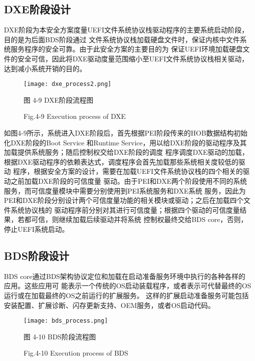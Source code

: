 \subsection{DXE阶段设计}
DXE阶段为本安全方案度量UEFI文件系统协议栈驱动程序的主要系统启动阶段，目的是为后面BDS阶段通过
文件系统协议栈加载硬盘文件时，保证内核中文件系统服务程序的安全可靠。由于此安全方案的主要目的为
保证UEFI环境加载硬盘文件的安全可信，因此将DXE驱动度量范围缩小至UEFI文件系统协议栈相关驱动，
达到减小系统开销的目的。

\begin{figure}[h]
    \vspace{0cm}   
    \setlength{\abovecaptionskip}{0.3cm}
	\centering
    \texttt{[image: dxe\_process2.png]}
    \caption*{图 4-9 DXE阶段流程图}
    \setlength{\belowcaptionskip}{-0.5cm}
    \caption*{Fig.4-9 Execution process of DXE}
\end{figure}

如图4-9所示，系统进入DXE阶段后，首先根据PEI阶段传来的HOB数据结构初始化DXE阶段的Boot Service
和Runtime Service，用以给DXE阶段的驱动程序及其加载提供系统服务；随后控制权交给DXE阶段的调度
程序调度DXE驱动的加载，根据DXE驱动程序的依赖表达式，调度程序会首先加载那些系统相关度较低的驱动
程序，根据安全方案的设计，需要在加载UEFI文件系统协议栈的四个相关的驱动之前加载DXE阶段的可信度量
驱动。由于PEI和DXE两个阶段使用不同的系统服务，而可信度量模块中需要分别使用到PEI系统服务和DXE系统
服务，因此为PEI和DXE阶段分别设计两个可信度量功能的相关模块或驱动；之后在加载四个文件系统协议栈的
驱动程序前分别对其进行可信度量；根据四个驱动的可信度量结果，若都可信，则继续加载后续驱动并将系统
控制权最终交给BDS core，否则，停止UEFI系统启动。

\subsection{BDS阶段设计}
BDS core通过BDS架构协议定位和加载在启动准备服务环境中执行的各种各样的应用。这些应用可
能表示一个传统的OS启动装载程序，或者表示可代替最终的OS运行或在加载最终的OS之前运行的扩展服务。
这样的扩展启动准备服务可能包括安装配置、扩展诊断、闪存更新支持、OEM服务，或者OS启动代码。

\begin{figure}[htb]
    \vspace{0cm}   
    \setlength{\abovecaptionskip}{0.3cm}
	\centering
    \texttt{[image: bds\_process.png]}
    \caption*{图 4-10 BDS阶段流程图}
    \setlength{\belowcaptionskip}{-0.3cm}
    \caption*{Fig.4-10 Execution process of BDS}
\end{figure}

